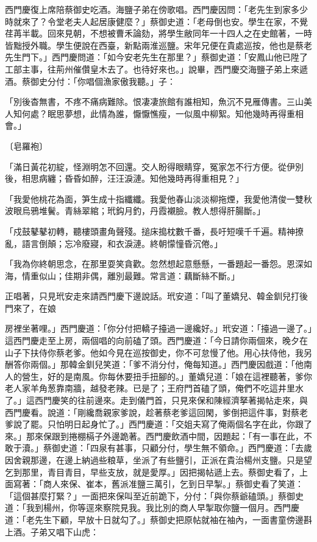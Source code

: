 \begin{showcontents}{}
西門慶復上席陪蔡御史吃酒。海鹽子弟在傍歌唱。西門慶因問：「老先生到家多少時就來了？令堂老夫人起居康健麼？」蔡御史道：「老母倒也安。學生在家，不覺荏苒半載。回來見朝，不想被曹禾論劾，將學生敝同年一十四人之在史館著，一時皆黜授外職。學生便說在西臺，新點兩淮巡鹽。宋年兄便在貴處巡按，他也是蔡老先生門下。」西門慶問道：「如今安老先生在那里？」蔡御史道：「安鳳山他已陞了工部主事，往荊州催儹皇木去了。也待好來也。」說畢，西門慶交海鹽子弟上來遞酒。蔡御史分付：「你唱個漁家傲我聽。」子：

「別後杳無書，不疼不痛病難除。恨凄凄旅館有誰相知，魚沉不見雁傳書。三山美人知何處？眠思夢想，此情為誰，懨懨憔瘦，一似風中柳絮。知他幾時再得重相會。」

〔皂羅袍〕

「滿日黃花初綻，怪淵明怎不回還。交人盼得眼睛穿，冤家怎不行方便。從伊別後，相思病纏；昏昏如醉，汪汪淚漣。知他幾時再得重相見？」

「我愛他桃花為面，笋生成十指纖纖。我愛他春山淡淡柳拖煙，我愛他清俊一雙秋波眼烏鴉堆鬢。青絲翠綰；玳鈎月釣，丹霞襯臉。教人想得肝腸斷。」

「戍鼓鼕鼕初轉，聽樓頭畫角聲殘。搥床搗枕數千番，長吁短嘆千千遍。精神撩亂，語言倒顛；忘冷廢寢，和衣淚漣。終朝懞憧昏沉倦。」

「我為你終朝思念，在那里耍笑貪歡。忽然想起意懸懸，一番題起一番怨。恩深如海，情重似山；佳期非偶，離別最難。常言道：藕斷絲不斷。」

正唱著，只見玳安走來請西門慶下邊說話。玳安道：「叫了董嬌兒、韓金釧兒打後門來了，在娘

房裡坐著哩。」西門慶道：「你分付把轎子擡過一邊纔好。」玳安道：「擡過一邊了。」這西門慶走至上房，兩個唱的向前磕了頭。西門慶道：「今日請你兩個來，晚夕在山子下扶侍你蔡老爹。他如今見在巡按御史，你不可怠慢了他。用心扶侍他，我另酬答你兩個。」那韓金釧兒笑道：「爹不消分付，俺每知道。」西門慶因戲道：「他南人的營生，好的是南風。你每休要扭手扭腳的。」董嬌兒道：「娘在這裡聽著，爹你老人家羊角葱靠南牆，越發老辣。已是了；王府門首磕了頭，俺們不吃這井里水了。」這西門慶笑的往前邊來。走到儀門首，只見來保和陳經濟拏著揭帖走來，與西門慶看。說道：「剛纔喬親家爹說，趁著蔡老爹這回閑，爹倒把這件事，對蔡老爹說了罷。只怕明日起身忙了。」西門慶道：「交姐夫寫了俺兩個名字在此，你跟了來。」那來保跟到捲棚槅子外邊跪著。西門慶飲酒中間，因題起：「有一事在此，不敢于瀆。」蔡御史道：「四泉有甚事，只顧分付，學生無不領命。」西門慶道：「去歲因舍親那邊，在邊上納過些粮草，坐派了有些鹽引，正派在貴治楊州支鹽。只是望乞到那里，青目青目，早些支放，就是愛厚。」因把揭帖遞上去。蔡御史看了，上面寫著：「商人來保、崔本，舊派准鹽三萬引，乞到日早掣。」蔡御史看了笑道：「這個甚麼打緊？」一面把來保叫至近前跪下，分付：「與你蔡爺磕頭。」蔡御史道：「我到楊州，你等逕來察院見我。我比別的商人早掣取你鹽一個月。西門慶道：「老先生下顧，早放十日就勾了。」蔡御史把原帖就袖在袖內，一面書童傍邊斟上酒。子弟又唱下山虎：


\end{showcontents}
